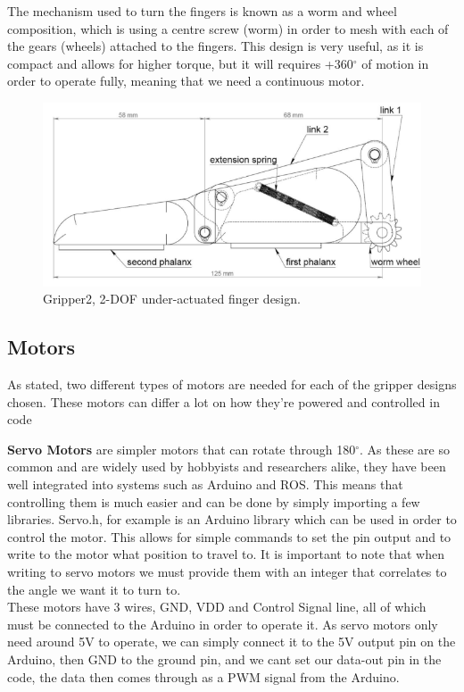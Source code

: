 \documentclass{l4proj}
\begin{document}
The mechanism used to turn the fingers is known as a worm and wheel composition, which is using a centre screw (worm) in order to mesh with each of the gears (wheels) attached to the fingers. This design is very useful, as it is compact and allows for higher torque, but it will requires +360$^{\circ}$ of motion in order to operate fully, meaning that we need a continuous motor. 

\begin{figure}[!ht]
    \centering
    \includegraphics[width=0.75\linewidth]{images/gripper2_Finger.png}    
    \caption{Gripper2, 2-DOF under-actuated finger design.}
    \label{fig:image1} 
\end{figure}

\subsection{Motors}
As stated, two different types of motors are needed for each of the gripper designs chosen. These motors can differ a lot on how they're powered and controlled in code

\textbf{Servo Motors} are simpler motors that can rotate through 180$^{\circ}$. As these are so common and are widely used by hobbyists and researchers alike, they have been well integrated into systems such as Arduino and ROS. This means that controlling them is much easier and can be done by simply importing a few libraries. Servo.h, for example is an Arduino library which can be used in order to control the motor. This allows for simple commands to set the pin output and to write to the motor what position to travel to. It is important to note that when writing to servo motors we must provide them with an integer that correlates to the angle we want it to turn to. \\
These motors have 3 wires, GND, VDD and Control Signal line, all of which must be connected to the Arduino in order to operate it. As servo motors only need around 5V to operate, we can simply connect it to the 5V output pin on the Arduino, then GND to the ground pin, and we cant set our data-out pin in the code, the data then comes through as a PWM signal from the Arduino. 
\end{document}
